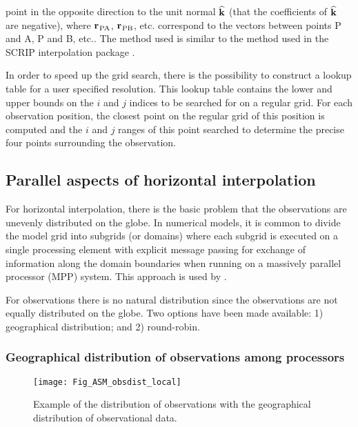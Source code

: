 \documentclass[../main/NEMO_manual]{subfiles}
\begin{document}
point in the opposite direction to the unit normal $\widehat{\bf k}$
(\ie that the coefficients of $\widehat{\bf k}$ are negative),
where ${{\bf r}_{}}_{\rm PA}$, ${{\bf r}_{}}_{\rm PB}$, etc. correspond to
the vectors between points P and A, P and B, etc..
The method used is similar to the method used in the SCRIP interpolation package \citep{Jones_1998}.

In order to speed up the grid search, there is the possibility to construct a lookup table for a user specified resolution.
This lookup table contains the lower and upper bounds on the $i$ and $j$ indices to
be searched for on a regular grid.
For each observation position, the closest point on the regular grid of this position is computed and
the $i$ and $j$ ranges of this point searched to determine the precise four points surrounding the observation. 

\subsection{Parallel aspects of horizontal interpolation}
\label{subsec:OBS_parallel}

For horizontal interpolation, there is the basic problem that
the observations are unevenly distributed on the globe.
In numerical models, it is common to divide the model grid into subgrids (or domains) where
each subgrid is executed on a single processing element with explicit message passing for
exchange of information along the domain boundaries when running on a massively parallel processor (MPP) system.
This approach is used by \NEMO.

For observations there is no natural distribution since the observations are not equally distributed on the globe. 
Two options have been made available:
1) geographical distribution;
and 2) round-robin.

\subsubsection{Geographical distribution of observations among processors}

\begin{figure}
  \begin{center}
    \texttt{[image: Fig\_ASM\_obsdist\_local]}
    \caption{
      \protect\label{fig:obslocal}
      Example of the distribution of observations with the geographical distribution of observational data.
    }
  \end{center}
\end{figure}
\end{document}
